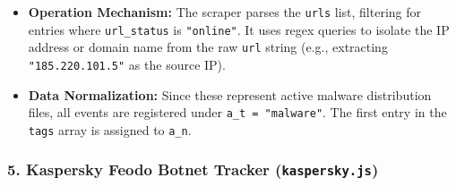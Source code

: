 \begin{itemize}
    \item \textbf{Operation Mechanism:} The scraper parses the \texttt{urls} list, filtering for entries where \texttt{url\_status} is \texttt{"online"}. It uses regex queries to isolate the IP address or domain name from the raw \texttt{url} string (e.g., extracting \texttt{"185.220.101.5"} as the source IP).
    \item \textbf{Data Normalization:} Since these represent active malware distribution files, all events are registered under \texttt{a\_t = "malware"}. The first entry in the \texttt{tags} array is assigned to \texttt{a\_n}.
\end{itemize}

\subsubsection{5. Kaspersky Feodo Botnet Tracker (\texttt{kaspersky.js})}
